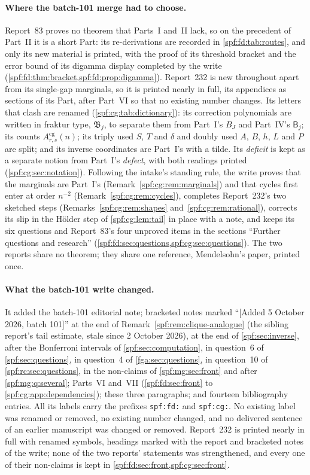 \documentclass[11pt]{article}
\numberwithin{equation}{section}
\theoremstyle{definition}
\theoremstyle{remark}
\theoremstyle{definition}
\begin{document}
\paragraph{Where the batch-101 merge had to choose.} Report~83 proves no
theorem that Parts~I and~II lack, so on the precedent of Part~II it is a
short Part: its re-derivations are recorded in \cref{spf:fd:tab:routes},
and only its new material is printed, with the proof of its threshold
bracket and the error bound of its digamma display completed by the write
(\cref{spf:fd:thm:bracket,spf:fd:prop:digamma}). Report~232 is new throughout
apart from its single-gap marginals, so it is printed nearly in full, its
appendices as sections of its Part, after Part~VI so that no existing number
changes. Its letters that clash are renamed (\cref{spf:cg:tab:dictionary}):
its correction polynomials are written in fraktur type, $\mathfrak B_j$, to
separate them from Part~I's $B_J$ and Part~IV's $\mathsf B_j$; its counts
$A^{\mathrm{cg}}_{r,s}(n)$; its triply used $S$, $T$ and $\delta$ and doubly
used $A$, $B$, $h$, $L$ and $P$ are split; and its inverse coordinates are
Part~I's with a tilde. Its \emph{deficit} is kept as a separate notion from
Part~I's \emph{defect}, with both readings printed
(\cref{spf:cg:sec:notation}). Following the intake's standing rule, the
write proves that the marginals are Part~I's
(Remark~\ref{spf:cg:rem:marginals}) and that cycles first enter at order
$n^{-2}$ (Remark~\ref{spf:cg:rem:cycles}), completes Report~232's two
sketched steps (Remarks~\ref{spf:cg:rem:shapes} and~\ref{spf:cg:rem:rational}),
corrects its slip in the H\"older step of \cref{spf:cg:lem:tail} in place
with a note, and keeps its six questions and Report~83's four unproved items
in the sections ``Further questions and research''
(\cref{spf:fd:sec:questions,spf:cg:sec:questions}). The two reports share no
theorem; they share one reference, Mendelsohn's paper, printed once.

\paragraph{What the batch-101 write changed.} It added the batch-101
editorial note; bracketed notes marked ``[Added 5 October 2026, batch 101]''
at the end of Remark~\ref{spf:rem:clique-analogue} (the sibling report's
tail estimate, stale since 2 October 2026), at the end of
\cref{spf:sec:inverse}, after the Bonferroni intervals of
\cref{spf:sec:computation}, in question~6 of \cref{spf:sec:questions}, in
question~4 of \cref{fga:sec:questions}, in question~10 of
\cref{spf:rc:sec:questions}, in the non-claims of \cref{spf:mg:sec:front} and
after \cref{spf:mg:q:several}; Parts~VI and~VII (\cref{spf:fd:sec:front} to
\cref{spf:cg:app:dependencies}); these three paragraphs; and fourteen
bibliography entries. All its labels carry the prefixes \texttt{spf:fd:} and
\texttt{spf:cg:}. No existing label was renamed or removed, no existing
number changed, and no delivered sentence of an earlier manuscript was
changed or removed. Report~232 is printed nearly in full with renamed
symbols, headings marked with the report and bracketed notes of the write;
none of the two reports' statements was strengthened, and every one of their
non-claims is kept in \cref{spf:fd:sec:front,spf:cg:sec:front}.
\end{document}
